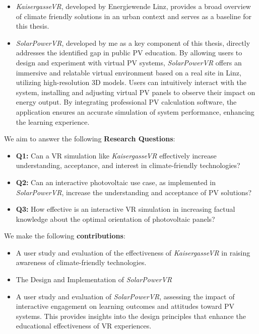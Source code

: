 \documentclass[draft, final]{vutinfth} %
\begin{document}
\begin{itemize}
    \item \textit{KaisergasseVR}, developed by Energiewende Linz, provides a broad overview of climate friendly solutions in an urban context and serves as a baseline for this thesis.
    \item \textit{SolarPowerVR}, developed by me as a key component of this thesis, directly addresses the identified gap in public PV education.  By allowing users to design and experiment with virtual PV systems, \textit{SolarPowerVR} offers an immersive and relatable virtual environment based on a real site in Linz, utilizing high-resolution 3D models.  Users can intuitively interact with the system, installing and adjusting virtual PV panels to observe their impact on energy output. By integrating professional PV calculation software, the application ensures an accurate simulation of system performance, enhancing the learning experience.
\end{itemize}

We aim to answer the following \textbf{Research Questions}:
\begin{itemize}
    \item \textbf{Q1:} Can a VR simulation like \textit{KaisergasseVR} effectively increase understanding, acceptance, and interest in climate-friendly technologies?
    \item \textbf{Q2:} Can an interactive photovoltaic use case, as implemented in \textit{SolarPowerVR}, increase the understanding and acceptance of PV solutions?
    \item \textbf{Q3:} How effective is an interactive VR simulation in increasing factual knowledge about the optimal orientation of photovoltaic panels?
\end{itemize}

We make the following \textbf{contributions}:
\begin{itemize}
    \item A user study and evaluation of the effectiveness of \textit{KaisergasseVR} in raising awareness of climate-friendly technologies.
    \item The Design and Implementation of \textit{SolarPowerVR}
    \item A user study and evaluation of \textit{SolarPowerVR}, assessing the impact of interactive engagement on learning outcomes and attitudes toward PV systems. This provides insights into the design principles that enhance the educational effectiveness of VR experiences.
\end{itemize}
\end{document}
